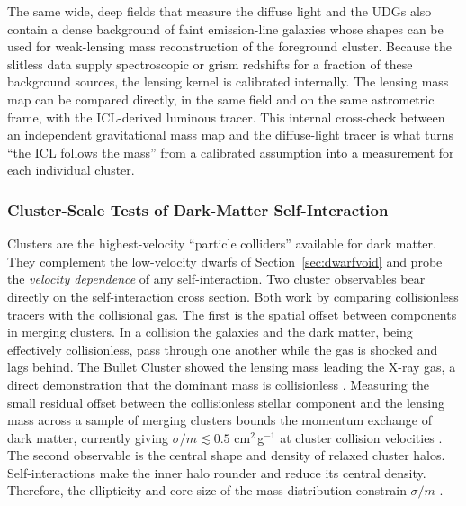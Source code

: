 \documentclass[10pt,onecolumn]{article}
\begin{document}
The same wide, deep fields that measure the diffuse light and the UDGs also contain a dense background of faint emission-line galaxies whose shapes can be used for weak-lensing mass reconstruction of the foreground cluster. Because the slitless data supply spectroscopic or grism redshifts for a fraction of these background sources, the lensing kernel is calibrated internally. The lensing mass map can be compared directly, in the same field and on the same astrometric frame, with the ICL-derived luminous tracer. This internal cross-check between an independent gravitational mass map and the diffuse-light tracer is what turns ``the ICL follows the mass'' from a calibrated assumption into a measurement for each individual cluster.

\subsubsection{Cluster-Scale Tests of Dark-Matter Self-Interaction}

Clusters are the highest-velocity ``particle colliders'' available for dark matter. They complement the low-velocity dwarfs of Section~\ref{sec:dwarfvoid} and probe the \emph{velocity dependence} of any self-interaction. Two cluster observables bear directly on the self-interaction cross section. Both work by comparing collisionless tracers with the collisional gas. The first is the spatial offset between components in merging clusters. In a collision the galaxies and the dark matter, being effectively collisionless, pass through one another while the gas is shocked and lags behind. The Bullet Cluster showed the lensing mass leading the X-ray gas, a direct demonstration that the dominant mass is collisionless \cite{clowe2006}. Measuring the small residual offset between the collisionless stellar component and the lensing mass across a sample of merging clusters bounds the momentum exchange of dark matter, currently giving $\sigma/m\lesssim0.5$ cm$^2$\,g$^{-1}$ at cluster collision velocities \cite{harvey2015}. The second observable is the central shape and density of relaxed cluster halos. Self-interactions make the inner halo rounder and reduce its central density. Therefore, the ellipticity and core size of the mass distribution constrain $\sigma/m$ \cite{peter2013}.
\end{document}
